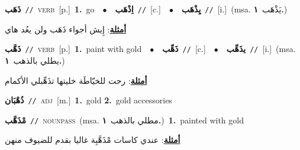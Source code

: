 \documentclass[10pt,a4paper,twoside]{article} %
\begin{document}
\begin{multicols}{2}
{\setlength\topsep{0pt}\textbf{\foreignlanguage{arabic}{ذَهَب}}\ {\color{gray}\texttt{//}\color{black}}\ \textsc{verb}\ [p.]\ \textbf{1.}~go\ \ $\bullet$\ \ \setlength\topsep{0pt}\textbf{\foreignlanguage{arabic}{اِذْهَب}}\ {\color{gray}\texttt{//}\color{black}}\ [c.]\ \ $\bullet$\ \ \setlength\topsep{0pt}\textbf{\foreignlanguage{arabic}{يِذْهَب}}\ {\color{gray}\texttt{//}\color{black}}\ [i.]\ \color{gray}(msa. \foreignlanguage{arabic}{يَذْهَب}~\foreignlanguage{arabic}{\textbf{١.}})\color{black}\  \begin{flushright}\color{gray}\foreignlanguage{arabic}{\textbf{\underline{\foreignlanguage{arabic}{أمثلة}}}: إِيش أجواء ذَهَب ولن يعُد هاي}\end{flushright}\color{black}} \vspace{2mm}

{\setlength\topsep{0pt}\textbf{\foreignlanguage{arabic}{ذَهَّب}}\ {\color{gray}\texttt{//}\color{black}}\ \textsc{verb}\ [p.]\ \textbf{1.}~paint with gold\ \ $\bullet$\ \ \setlength\topsep{0pt}\textbf{\foreignlanguage{arabic}{ذَهِّب}}\ {\color{gray}\texttt{//}\color{black}}\ [c.]\ \ $\bullet$\ \ \setlength\topsep{0pt}\textbf{\foreignlanguage{arabic}{يذَهِّب}}\ {\color{gray}\texttt{//}\color{black}}\ [i.]\ \color{gray}(msa. \foreignlanguage{arabic}{يطلي بالذهب}~\foreignlanguage{arabic}{\textbf{١.}})\color{black}\  \begin{flushright}\color{gray}\foreignlanguage{arabic}{\textbf{\underline{\foreignlanguage{arabic}{أمثلة}}}: رحت للخيّاطَة خليتها تذَهِّبلي الأكمام}\end{flushright}\color{black}} \vspace{2mm}

{\setlength\topsep{0pt}\textbf{\foreignlanguage{arabic}{ذُهْبَان}}\ {\color{gray}\texttt{//}\color{black}}\ \textsc{adj}\ [m.]\ \textbf{1.}~gold  \textbf{2.}~gold accessories\ } \vspace{2mm}

{\setlength\topsep{0pt}\textbf{\foreignlanguage{arabic}{مْذَهَّب}}\ {\color{gray}\texttt{//}\color{black}}\ \textsc{noun\textunderscore pass}\ \color{gray}(msa. \foreignlanguage{arabic}{مطلي بالذهب}~\foreignlanguage{arabic}{\textbf{١.}})\color{black}\ \textbf{1.}~painted with gold\  \begin{flushright}\color{gray}\foreignlanguage{arabic}{\textbf{\underline{\foreignlanguage{arabic}{أمثلة}}}: عندي كاسات مْذَهَّبِة غاليا بقدم للضيوف منهن}\end{flushright}\color{black}} \vspace{2mm}


\end{multicols}
\end{document}

